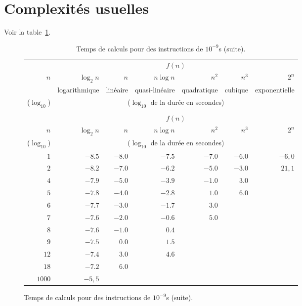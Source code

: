 \section{Complexités usuelles}
Voir la table~\ref{table.complexites.usuelles}.
\begin{figure}[!h]
\begin{center}
\begin{longtable}{rrrrrrr}
\caption{Temps de calculs pour des instructions de $10^{-9}$s.}\label{table.complexites.usuelles}\\
\toprule
   & \multicolumn{6}{c}{$f(n)$} \\ \cmidrule(l){2-7}
   $n$   & $\log_{2} n$ & $n$      & $n\log n$& $n^2$    & $n^3$     &
   $2^n$\\
  
& logarithmique & linéaire &quasi-linéaire & quadratique & cubique & exponentielle \\  \cmidrule(l){2-7}
   
   ($\log_{10}$) & \multicolumn{6}{c}{($\log_{10}$ de la
     durée en secondes)}\\
   \midrule
\endfirsthead
\caption{Temps de calculs pour des instructions de $10^{-9}$s (suite).}\\
\toprule
   & \multicolumn{6}{c}{$f(n)$} \\ \cmidrule(l){2-7}
   $n$   & $\log_{2} n$ & $n$      & $n\log n$& $n^2$    & $n^3$     &
   $2^n$\\
   ($\log_{10}$) & \multicolumn{6}{c}{($\log_{10}$ de la
     durée en secondes)}\\
   \midrule
\endhead
$1$ & $-8.5$ & $-8.0$ & $-7.5$ & $-7.0$ & $-6.0$ & $-6,0$\\
$2$ & $-8.2$ & $-7.0$ & $-6.2$ & $-5.0$ & $-3.0$ & $21,1$\\
$4$ & $-7.9$ & $-5.0$ & $-3.9$ & $-1.0$ & $3.0$ & \\
$5$ & $-7.8$ & $-4.0$ & $-2.8$ & $1.0$ & $6.0$ & \\
$6$ & $-7.7$ & $-3.0$ & $-1.7$ & $3.0$ & & \\
$7$ & $-7.6$ & $-2.0$ & $-0.6$ & $5.0$ & & \\
$8$ & $-7.6$ & $-1.0$ & $0.4$ & & & \\
$9$ & $-7.5$ & $0.0$ & $1.5$ & & & \\
$12$ & $-7.4$ & $3.0$ & $4.6$ & & & \\
$18$ & $-7.2$ & $6.0$ & & & & \\
$1000$ & $-5,5$ & & & & & \\
 \bottomrule  
\end{longtable}
\end{center}
\end{figure}

